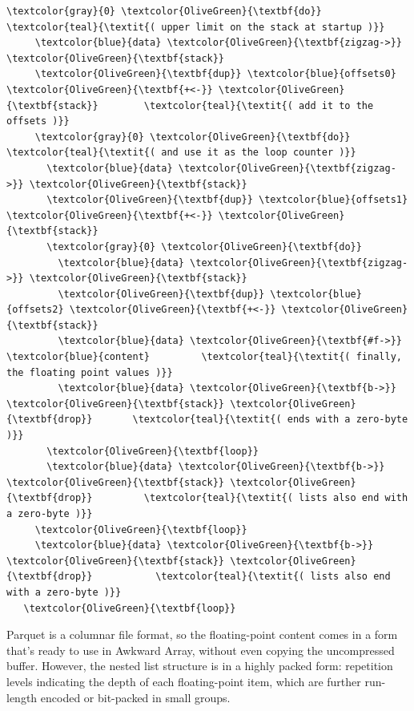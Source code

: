 \documentclass{webofc}
\begin{document}
\begin{Verbatim}[commandchars=\\\{\}]
   \textcolor{gray}{0} \textcolor{OliveGreen}{\textbf{do}}                            \textcolor{teal}{\textit{( upper limit on the stack at startup )}}
     \textcolor{blue}{data} \textcolor{OliveGreen}{\textbf{zigzag->}} \textcolor{OliveGreen}{\textbf{stack}}
     \textcolor{OliveGreen}{\textbf{dup}} \textcolor{blue}{offsets0} \textcolor{OliveGreen}{\textbf{+<-}} \textcolor{OliveGreen}{\textbf{stack}}        \textcolor{teal}{\textit{( add it to the offsets )}}
     \textcolor{gray}{0} \textcolor{OliveGreen}{\textbf{do}}                          \textcolor{teal}{\textit{( and use it as the loop counter )}}
       \textcolor{blue}{data} \textcolor{OliveGreen}{\textbf{zigzag->}} \textcolor{OliveGreen}{\textbf{stack}}
       \textcolor{OliveGreen}{\textbf{dup}} \textcolor{blue}{offsets1} \textcolor{OliveGreen}{\textbf{+<-}} \textcolor{OliveGreen}{\textbf{stack}}
       \textcolor{gray}{0} \textcolor{OliveGreen}{\textbf{do}}
         \textcolor{blue}{data} \textcolor{OliveGreen}{\textbf{zigzag->}} \textcolor{OliveGreen}{\textbf{stack}}
         \textcolor{OliveGreen}{\textbf{dup}} \textcolor{blue}{offsets2} \textcolor{OliveGreen}{\textbf{+<-}} \textcolor{OliveGreen}{\textbf{stack}}
         \textcolor{blue}{data} \textcolor{OliveGreen}{\textbf{#f->}} \textcolor{blue}{content}         \textcolor{teal}{\textit{( finally, the floating point values )}}
         \textcolor{blue}{data} \textcolor{OliveGreen}{\textbf{b->}} \textcolor{OliveGreen}{\textbf{stack}} \textcolor{OliveGreen}{\textbf{drop}}       \textcolor{teal}{\textit{( ends with a zero-byte )}}
       \textcolor{OliveGreen}{\textbf{loop}}
       \textcolor{blue}{data} \textcolor{OliveGreen}{\textbf{b->}} \textcolor{OliveGreen}{\textbf{stack}} \textcolor{OliveGreen}{\textbf{drop}}         \textcolor{teal}{\textit{( lists also end with a zero-byte )}}
     \textcolor{OliveGreen}{\textbf{loop}}
     \textcolor{blue}{data} \textcolor{OliveGreen}{\textbf{b->}} \textcolor{OliveGreen}{\textbf{stack}} \textcolor{OliveGreen}{\textbf{drop}}           \textcolor{teal}{\textit{( lists also end with a zero-byte )}}
   \textcolor{OliveGreen}{\textbf{loop}}
\end{Verbatim}
\normalsize

\noindent Parquet is a columnar file format, so the floating-point content comes in a form that's ready to use in Awkward Array, without even copying the uncompressed buffer. However, the nested list structure is in a highly packed form: repetition levels indicating the depth of each floating-point item, which are further run-length encoded or bit-packed in small groups.
\end{document}
